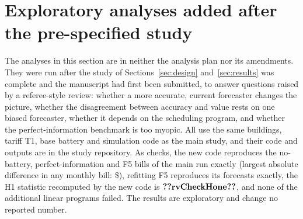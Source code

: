 \section{Exploratory analyses added after the pre-specified study}\label{sec:explore}

The analyses in this section are in neither the analysis plan nor its amendments. They were run after the study of Sections~\ref{sec:design} and~\ref{sec:results} was complete and the manuscript had first been submitted, to answer questions raised by a referee-style review: whether a more accurate, current forecaster changes the picture, whether the disagreement between accuracy and value rests on one biased forecaster, whether it depends on the scheduling program, and whether the perfect-information benchmark is too myopic. All use the same buildings, tariff T1, base battery and simulation code as the main study, and their code and outputs are in the study repository. As checks, the new code reproduces the no-battery, perfect-information and F5 bills of the main run exactly (largest absolute difference in any monthly bill: \$), refitting F5 reproduces its forecasts exactly, the H1 statistic recomputed by the new code is $\res{rvCheckHone}$, and none of the additional linear programs failed. The results are exploratory and change no reported number.

